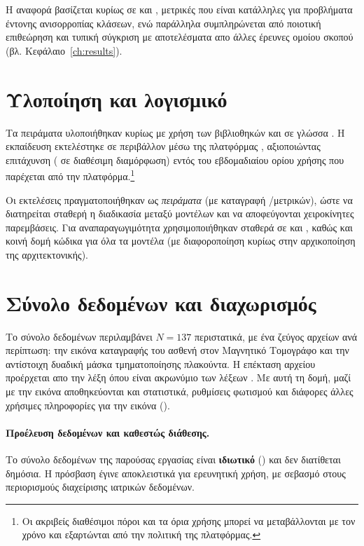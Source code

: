 Η αναφορά βασίζεται κυρίως σε  και , μετρικές που είναι
κατάλληλες για προβλήματα έντονης ανισορροπίας κλάσεων, ενώ 
παράλληλα συμπληρώνεται από ποιοτική επιθεώρηση και
τυπική σύγκριση με αποτελέσματα απο άλλες έρευνες ομοίου σκοπού (βλ. Κεφάλαιο~\ref{ch:results}).

\section{Υλοποίηση και λογισμικό}
\label{sec:exp_software}

Τα πειράματα υλοποιήθηκαν κυρίως με χρήση των βιβλιοθηκών  και 
 \cite{cardoso2022monai} σε γλώσσα . Η εκπαίδευση εκτελέστηκε σε περιβάλλον
 μέσω της πλατφόρμας , αξιοποιώντας  επιτάχυνση 
( σε διαθέσιμη διαμόρφωση) εντός του εβδομαδιαίου ορίου χρήσης που 
παρέχεται από την πλατφόρμα.\footnote{Οι ακριβείς διαθέσιμοι πόροι και τα όρια χρήσης μπορεί να
μεταβάλλονται με τον χρόνο και εξαρτώνται από την πολιτική της πλατφόρμας.}

Οι εκτελέσεις πραγματοποιήθηκαν ως \emph{ πειράματα} 
(με καταγραφή /μετρικών), ώστε να διατηρείται σταθερή
η διαδικασία μεταξύ μοντέλων και να αποφεύγονται χειροκίνητες παρεμβάσεις.
Για αναπαραγωγιμότητα χρησιμοποιήθηκαν σταθερά  σε 
 και , καθώς και κοινή δομή κώδικα για όλα τα μοντέλα
(με διαφοροποίηση κυρίως στην αρχικοποίηση της αρχιτεκτονικής).

\section{Σύνολο δεδομένων και διαχωρισμός}
\label{sec:exp_data}

Το σύνολο δεδομένων περιλαμβάνει $N=137$ περιστατικά, με ένα ζεύγος αρχείων
 ανά περίπτωση: την εικόνα καταγραφής του ασθενή στον Μαγνητικό Τομογράφο
και την αντίστοιχη δυαδική μάσκα τμηματοποί\-ησης πλακούντα.
Η επέκταση αρχείου  προέρχεται απο την λέξη  όπου είναι ακρωνύμιο των λέξεων 
. 
Με αυτή τη δομή, μαζί με την εικόνα αποθηκεύονται και στατιστικά, ρυθμίσεις φωτισμού και 
διάφορες άλλες χρήσιμες πληροφορίες για την εικόνα ().

\paragraph{Προέλευση δεδομένων και καθεστώς διάθεσης.}
Το σύνολο δεδομένων της παρούσας εργασίας είναι \textbf{ιδιωτικό} ()
και δεν διατίθεται δημόσια. Η πρόσβαση έγινε αποκλειστικά για ερευνητική χρήση,
με σεβασμό στους περιορισμούς διαχείρισης ιατρικών δεδομένων.

